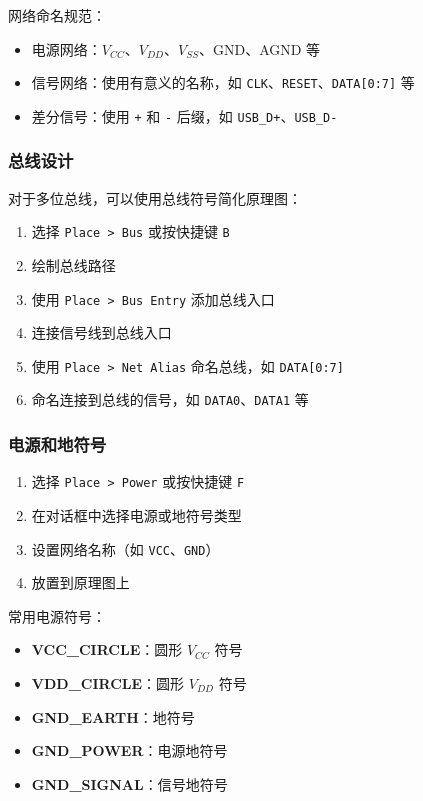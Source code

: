 网络命名规范：

\begin{itemize}
  \item 电源网络：$V_{CC}$、$V_{DD}$、$V_{SS}$、GND、AGND 等
  \item 信号网络：使用有意义的名称，如 \lstinline{CLK}、\lstinline{RESET}、\lstinline{DATA[0:7]} 等
  \item 差分信号：使用 \lstinline{+} 和 \lstinline{-} 后缀，如 \lstinline{USB_D+}、\lstinline{USB_D-}
\end{itemize}

\subsubsection{总线设计}

对于多位总线，可以使用总线符号简化原理图：


\begin{enumerate}
  \item 选择 \lstinline{Place > Bus} 或按快捷键 \lstinline{B}
  \item 绘制总线路径
  \item 使用 \lstinline{Place > Bus Entry} 添加总线入口
  \item 连接信号线到总线入口
  \item 使用 \lstinline{Place > Net Alias} 命名总线，如 \lstinline{DATA[0:7]}
  \item 命名连接到总线的信号，如 \lstinline{DATA0}、\lstinline{DATA1} 等
\end{enumerate}

\subsubsection{电源和地符号}


\begin{enumerate}
  \item 选择 \lstinline{Place > Power} 或按快捷键 \lstinline{F}
  \item 在对话框中选择电源或地符号类型
  \item 设置网络名称（如 \lstinline{VCC}、\lstinline{GND}）
  \item 放置到原理图上
\end{enumerate}

常用电源符号：

\begin{itemize}
  \item \textbf{VCC\_CIRCLE}：圆形 $V_{CC}$ 符号
  \item \textbf{VDD\_CIRCLE}：圆形 $V_{DD}$ 符号
  \item \textbf{GND\_EARTH}：地符号
  \item \textbf{GND\_POWER}：电源地符号
  \item \textbf{GND\_SIGNAL}：信号地符号
\end{itemize}

